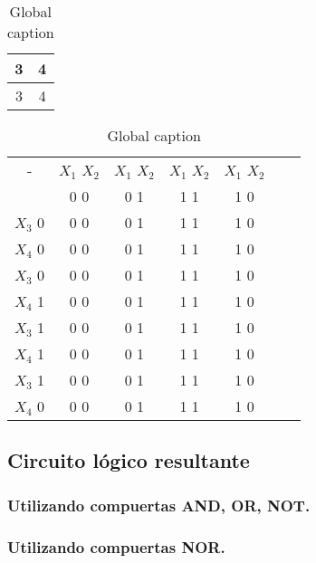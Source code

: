 \begin{table}[!htb]
    \caption{Global caption}
    \begin{minipage}{.5\linewidth}
      \centering
        \begin{tabular}{|c|c|}
            \hline
            3 & 4\\
            \hline
            3 & 4\\
            \hline
        \end{tabular}
    \end{minipage}%
    \begin{minipage}{.5\linewidth}
      \centering
        \begin{tabular}{|c|c|c|c|c|c|c|}
            \hline
            - & \(X_{1}\) \(X_{2}\) & \(X_{1}\) \(X_{2}\) & \(X_{1}\) \(X_{2}\) & \(X_{1}\) \(X_{2}\)\\
            & 0   0 & 0  1 & 1   1 & 1   0\\
            \hline
            \(X_{3}\) 0& 0 0 & 0 1 & 1 1 & 1 0\\
            \(X_{4}\) 0 & 0 0 & 0 1 & 1 1 & 1 0\\
            \hline
            \(X_{3}\) 0& 0 0 & 0 1 & 1 1 & 1 0\\
            \(X_{4}\) 1& 0 0 & 0 1 & 1 1 & 1 0\\
            \hline
            \(X_{3}\) 1& 0 0 & 0 1 & 1 1 & 1 0\\
            \(X_{4}\) 1& 0 0 & 0 1 & 1 1 & 1 0\\
            \hline
            \(X_{3}\) 1& 0 0 & 0 1 & 1 1 & 1 0\\
            \(X_{4}\) 0& 0 0 & 0 1 & 1 1 & 1 0\\
            \hline
            
            

        \end{tabular}
    \end{minipage} 
\end{table}

\subsection{Circuito lógico resultante}
\subsubsection{Utilizando compuertas AND, OR, NOT.}

\subsubsection{Utilizando compuertas NOR.}

